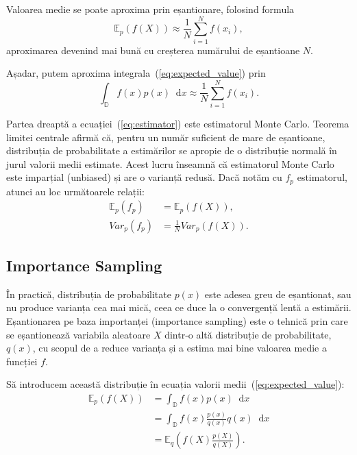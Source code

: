 \documentclass[12pt,a4paper]{report}
\newcommand*\diff{\mathop{}\!\mathrm{d}}
\numberwithin{equation}{section} %
\begin{document}
Valoarea medie se poate aproxima prin eșantionare, folosind formula
\begin{equation}
	\mathbb{E}_p(f(X)) \approx \frac{1}{N} \sum_{i=1}^{N} f(x_i),
\end{equation}
aproximarea devenind mai bună cu creșterea numărului de eșantioane $N$.

Așadar, putem aproxima integrala~(\ref{eq:expected_value}) prin
\begin{equation}\label{eq:estimator}
	\int_{\mathbb{D}} f(x) p(x)\diff x \approx \frac{1}{N} \sum_{i=1}^{N} f(x_i).
\end{equation}

Partea dreaptă a ecuației~(\ref{eq:estimator}) este estimatorul Monte Carlo.
Teorema limitei centrale afirmă că, pentru un număr suficient de mare de eșantioane,
distribuția de probabilitate a estimărilor se apropie de o distribuție normală în
jurul valorii medii estimate. Acest lucru înseamnă că estimatorul Monte
Carlo este imparțial (unbiased) și are o varianță redusă. Dacă notăm cu $f_p$
estimatorul, atunci au loc următoarele relații:
\begin{equation}
	\begin{aligned}
		\mathbb{E}_p(f_p) & = \mathbb{E}_p(f(X)),     \\
		Var_p(f_p)        & = \frac{1}{N}Var_p(f(X)).
	\end{aligned}
\end{equation}

\subsection{Importance Sampling}

În practică, distribuția de probabilitate $p(x)$ este adesea greu de eșantionat,
sau nu produce varianța cea mai mică, ceea ce duce la o convergență lentă a
estimării.
Eșantionarea pe baza importanței (importance sampling) este o tehnică prin care
se eșantionează variabila aleatoare $X$ dintr-o altă distribuție de probabilitate,
$q(x)$, cu scopul de a reduce varianța și a estima mai bine valoarea medie a funcției
$f$.

Să introducem această distribuție în ecuația valorii medii~(\ref{eq:expected_value}):
\begin{equation}
	\begin{aligned}
		\mathbb{E}_p(f(X)) & = \int_{\mathbb{D}} f(x) p(x)\diff x                   \\
		                   & = \int_{\mathbb{D}} f(x) \frac{p(x)}{q(x)} q(x)\diff x \\
		                   & = \mathbb{E}_q\left(f(X) \frac{p(X)}{q(X)}\right).
	\end{aligned}
\end{equation}
\end{document}
